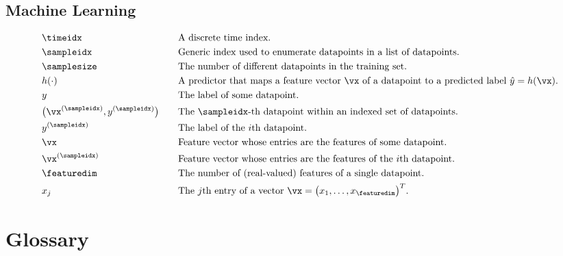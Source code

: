 \documentclass[12pt]{report}
\newcommand{\featurelen}{\featuredim}
\begin{document}
\section{Machine Learning}
\begin{align} 
&\timeidx  &\quad &\mbox{A discrete time index.} \nonumber \\
&\sampleidx  &\quad &\mbox{Generic index used to enumerate datapoints in a list of datapoints. } \nonumber \\
&\samplesize  &\quad &\mbox{The number of different datapoints in the training set.} \nonumber \\ 
&h(\cdot)  &\quad &\mbox{A predictor that maps a feature vector $\vx$ of a datapoint to a predicted label $\hat{y}=h(\vx)$.} \nonumber \\ 
&y  &\quad &\mbox{The label of some datapoint.} \nonumber \\ 
&\big(\vx^{(\sampleidx)},y^{(\sampleidx)}\big)  &\quad &\mbox{The $\sampleidx$-th datapoint within an indexed set of datapoints.} \nonumber \\ 
&y^{(\sampleidx)}  &\quad &\mbox{The label of the $i$th datapoint.} \nonumber \\ 
&\vx  &\quad &\mbox{Feature vector whose entries are the features of some datapoint.} \nonumber \\ 
&\vx^{(\sampleidx)}  &\quad &\mbox{Feature vector whose entries are the features of the $i$th datapoint.} \nonumber \\ 
&\featurelen &\quad &\mbox{The number of (real-valued) features of a single datapoint.} \nonumber  \\ 
&x_{j} &\quad &\mbox{The $j$th entry of a vector $\vx=\big(x_{1},\ldots,x_{\featuredim}\big)^{T}$.} \nonumber
\end{align} 


\chapter{Glossary} 
\end{document}
